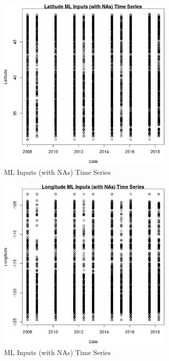 \begin{figure} 
\centering  
\includegraphics[width=0.77\textwidth]{Code_Outputs/Report_ML_input_PM25_Step4_part_e_de_duplicated_aves_compiled_2019-05-18wNAs_LatitudevDate.jpg} 
\caption{\label{fig:Report_ML_input_PM25_Step4_part_e_de_duplicated_aves_compiled_2019-05-18wNAsLatitudevDate}ML Inputs (with NAs) Time Series} 
\end{figure} 
 

\begin{figure} 
\centering  
\includegraphics[width=0.77\textwidth]{Code_Outputs/Report_ML_input_PM25_Step4_part_e_de_duplicated_aves_compiled_2019-05-18wNAs_LongitudevDate.jpg} 
\caption{\label{fig:Report_ML_input_PM25_Step4_part_e_de_duplicated_aves_compiled_2019-05-18wNAsLongitudevDate}ML Inputs (with NAs) Time Series} 
\end{figure} 
 

